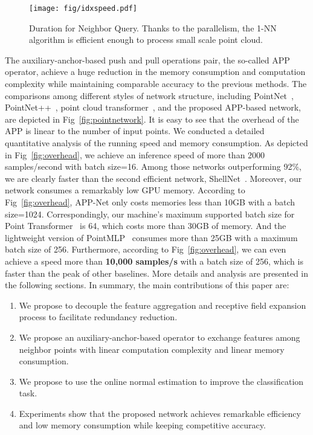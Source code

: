 \documentclass[journal]{IEEEtran}
\begin{document}
\begin{figure}[t]
\begin{center}
\label{fig:voxeltime}
\texttt{[image: fig/idxspeed.pdf]}
\end{center}
\vspace{-0.3cm}
   \caption{Duration for Neighbor Query. Thanks to the parallelism, the 1-NN algorithm is efficient enough to process small scale point cloud.}
\end{figure}
 
 The auxiliary-anchor-based push and pull operations pair, the so-called APP operator, achieve a huge reduction in the memory consumption and computation complexity while maintaining comparable accuracy to the previous methods. The comparisons among different styles of network structure, including PointNet~\cite{PointNet}, PointNet++~\cite{PointNet++}, point cloud transformer~\cite{guo2021pct}, and the proposed APP-based network, are depicted in Fig~\ref{fig:pointnetwork}. It is easy to see that the overhead of the APP is linear to the number of input points. We conducted a detailed quantitative analysis of the running speed and memory consumption. As depicted in Fig~\ref{fig:overhead}, we achieve an inference speed of more than 2000 samples/second with batch size=16. Among those networks outperforming 92\%, we are clearly faster than the second efficient network, ShellNet~\cite{shellnet}. Moreover, our network consumes a remarkably low GPU memory. According to Fig~\ref{fig:overhead}, APP-Net only costs memories less than 10GB with a batch size=1024. Correspondingly, our machine's maximum supported batch size for Point Transformer~\cite{zhao2021point} is 64, which costs more than 30GB of memory. And the lightweight version of PointMLP~\cite{ma2022rethinking} consumes more than 25GB with a maximum batch size of 256. Furthermore, according to Fig~\ref{fig:overhead}, we can even achieve a speed more than {\bf10,000 samples/s} with a batch size of 256, which is {} faster than the peak of other baselines. More details and analysis are presented in the following sections. In summary, the main contributions of this paper are:
 
 \begin{enumerate}
     \item We propose to decouple the feature aggregation and receptive field expansion process to facilitate redundancy reduction.
     \item We propose an auxiliary-anchor-based operator to exchange features among neighbor points with linear computation complexity and linear memory consumption.
\item We propose to use the online normal estimation to improve the classification task.
     \item Experiments show that the proposed network achieves remarkable efficiency and low memory consumption while keeping competitive accuracy.
 \end{enumerate}
\end{document}
